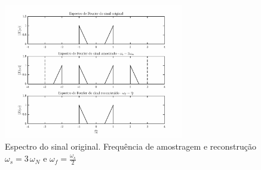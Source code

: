 \begin{enumerate}
        \begin{figure}[H]
            \centering
            \includegraphics[width=0.7\textwidth]{./images/ex1d2.eps}
            \caption{Espectro do sinal original. Frequência de amostragem e reconstrução $\omega_s = 3 \, \omega_N$ e $\omega_f = \frac{\omega_s}{2}$}
            \label{fig:ex1d2}
        \end{figure}
    
    \end{enumerate}